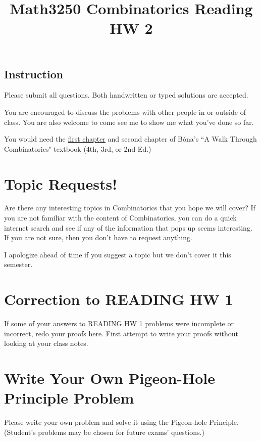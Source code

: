 \documentclass[10pt]{amsart}
\title{Math3250 Combinatorics Reading HW 2}
\begin{document}
\maketitle



\subsection*{Instruction}
Please submit all questions. Both handwritten or typed solutions are accepted.

You are encouraged to discuss the problems with other people in or outside of class. You are also welcome to come see me to show me what you've done so far.

You would need the \href{https://www.worldscientific.com/doi/pdf/10.1142/9789813148857_0001}{first chapter} and second chapter of  B\'ona's ``A Walk Through Combinatorics" textbook (4th, 3rd, or 2nd Ed.)



\bigskip

\section{Topic Requests!}
Are there any interesting topics in Combinatorics that you hope we will cover? If you are not familiar with the content of Combinatorics, you can do a quick internet search and see if any of the information that pops up seems interesting. If you are not sure, then you don't have to request anything.

I apologize ahead of time if you suggest a topic but we don't cover it this semester.

\section{Correction to READING HW 1}
If some of your answers to READING HW 1 problems were incomplete or incorrect, redo your proofs here. First attempt to write your proofs without looking at your class notes.


\section{Write Your Own Pigeon-Hole Principle Problem}\label{sec:write_your_own}
Please write your own problem and solve it using the Pigeon-hole Principle.
(Student's problems may be chosen for future exams' questions.)
\end{document}
